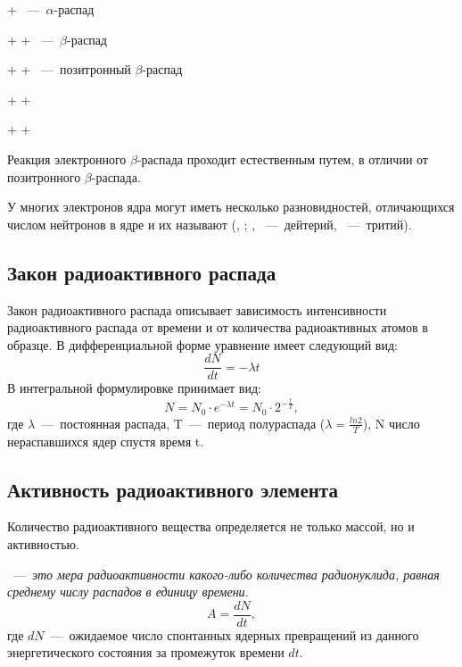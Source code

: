 \documentclass[a4paper, 14pt]{article}
\renewcommand{\emph}[1]{{\color{RedOrange}{\textit{\textbf{#1}}}}}
\begin{document}
 \rightarrow {} + ~---~$\alpha$-распад

 \rightarrow {} +  + ~---~$\beta$-распад

 \rightarrow {} +  + ~---~позитронный $\beta$-распад

 \rightarrow {} +  + 

 \rightarrow {} +  + 

Реакция электронного $\beta$-распада проходит естественным путем, в отличии от
позитронного $\beta$-распада.

У многих электронов ядра могут иметь несколько разновидностей,
отличающихся числом нейтронов в ядре и их называют \emph{изотопами} (, ; , ~---~дейтерий, ~---~тритий).

\subsection{Закон радиоактивного распада}
Закон радиоактивного распада описывает зависимость интенсивности радиоактивного распада от времени и от количества радиоактивных атомов в образце. В дифференциальной форме уравнение имеет следующий вид: 
\begin{equation}
    \frac{dN}{dt} = - \lambda t
\end{equation}
В интегральной формулировке принимает вид:
\begin{equation}
    N = N_0 \cdot e^{-\lambda t} = N_0 \cdot 2^{-\frac{t}{T}},
\end{equation}
где  $\lambda$~---~постоянная распада, T~---~период полураспада ($\lambda = \frac{ln2}{T}$), N число нераспавшихся ядер спустя время t.

\subsection{Активность радиоактивного элемента}
Количество радиоактивного вещества определяется не только массой, но и
активностью.

\emph{Активность (А)}~---~\textit{это мера радиоактивности какого-либо количества
радионуклида, равная среднему числу распадов в единицу времени.}
\begin{equation}
    A = \frac{dN}{dt},
\end{equation}
где $dN$~---~ожидаемое число спонтанных ядерных превращений из
данного энергетического состояния за промежуток времени $dt$.
\end{document}

